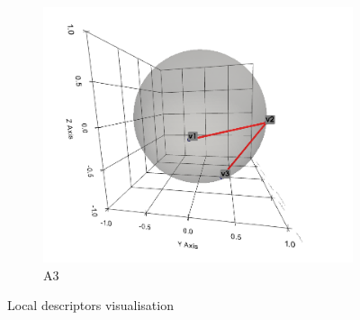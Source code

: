 \begin{figure}[ht]
    \begin{subfigure}[b]{0.4\textwidth}
        \includegraphics[width=\textwidth]{assets/visualisation/A3.png}
        \caption{A3}
        \label{fig:local_descriptor_visualisation_A3}
    \end{subfigure}
    \hfill
    
    \caption{Local descriptors visualisation}
    \label{fig:local_descriptor_visualisation}
\end{figure}


